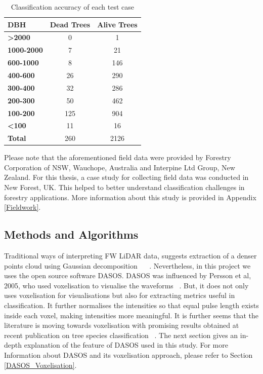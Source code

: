 \documentclass{subfiles}
\begin{document}
\begin{table}[!h]
	\centering
	\begin{tabular}{| l || c | c | }
		\hline		
		\textbf{DBH} &\textbf{Dead Trees} & \textbf{Alive Trees }\\	
		\hline			
		\hline			
		\textbf{>2000} & 0 & 1\\
		\hline			
		\textbf{1000-2000} & 7 & 21\\
		\hline			
		\textbf{600-1000} & 8 & 146\\
		\hline			
		\textbf{400-600} & 26 & 290\\
		\hline			
		\textbf{300-400} & 32 & 286\\
		\hline			
		\textbf{200-300} & 50 & 462\\
		\hline			
		\textbf{100-200} &125 & 904\\
		\hline			
		\textbf{<100} & 11 & 16\\
		\hline			
		\textbf{Total} & 260 & 2126 \\
		
		
		
		
		\hline  
	\end{tabular}
	\caption{ Classification accuracy of each test case}
	\label{tab:DBH}
\end{table}

\par Please note that the aforementioned field data were provided by Forestry Corporation of NSW, Wauchope, Australia and Interpine Ltd Group, New Zealand. For this thesis, a case study for collecting field data was conducted in New Forest, UK. This helped to better understand classification challenges in forestry applications. More information about this study is provided in Appendix \ref{Fieldwork}.

\subsection{Methods and Algorithms}

\par Traditional ways of interpreting FW LiDAR data, suggests extraction of a denser points cloud using Gaussian decomposition ~\cite{Neuenschwander2009} ~\cite{Reitberger2008}. Nevertheless, in this project we uses the open source software DASOS. DASOS was influenced by Persson et al, 2005, who used voxelisation to visualise the waveforms ~\cite{Persson2005}. But, it does not only uses voxelisation for visualisations but also for extracting metrics useful in classification. It further normalises the intensities so that equal pulse length exists inside each voxel, making intensities more meaningful. It is further seems that the literature is moving towards voxelisation with promising results obtained at recent publication on tree species classification ~\cite{Cao2016}. The next section gives an in-depth explanation of the feature of DASOS used in this study. For more Information about DASOS and its voxelisation approach, please refer to  Section \ref{DASOS_Voxelisation}.
\end{document}
